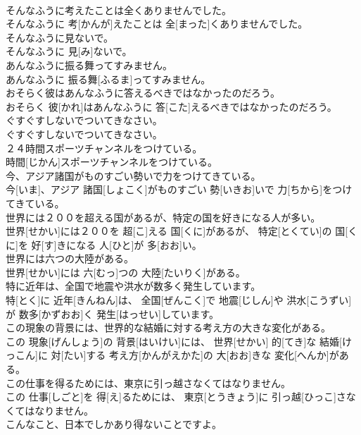 \documentclass[8pt]{extreport}
\begin{document}
\begin{CJK}{UTF8}{min}
\\	そんなふうに考えたことは全くありませんでした。	
\\	そんなふうに 考[かんが]えたことは 全[まった]くありませんでした。	
\\	そんなふうに見ないで。	
\\	そんなふうに 見[み]ないで。	
\\	あんなふうに振る舞ってすみません。	
\\	あんなふうに 振る舞[ふるま]ってすみません。	
\\	おそらく彼はあんなふうに答えるべきではなかったのだろう。	
\\	おそらく 彼[かれ]はあんなふうに 答[こた]えるべきではなかったのだろう。	
\\	ぐすぐすしないでついてきなさい。	
\\	ぐすぐすしないでついてきなさい。	
\\	２４時間スポーツチャンネルをつけている。	
\\	時間[じかん]スポーツチャンネルをつけている。	
\\	今、アジア諸国がものすごい勢いで力をつけてきている。	
\\	今[いま]、アジア 諸国[しょこく]がものすごい 勢[いきお]いで 力[ちから]をつけてきている。	
\\	世界には２００を超える国があるが、特定の国を好きになる人が多い。	
\\	世界[せかい]には２００を 超[こ]える 国[くに]があるが、 特定[とくてい]の 国[くに]を 好[す]きになる 人[ひと]が 多[おお]い。	
\\	世界には六つの大陸がある。	
\\	世界[せかい]には 六[むっ]つの 大陸[たいりく]がある。	
\\	特に近年は、全国で地震や洪水が数多く発生しています。	
\\	特[とく]に 近年[きんねん]は、 全国[ぜんこく]で 地震[じしん]や 洪水[こうずい]が 数多[かずおお]く 発生[はっせい]しています。	
\\	この現象の背景には、世界的な結婚に対する考え方の大きな変化がある。	
\\	この 現象[げんしょう]の 背景[はいけい]には、 世界[せかい] 的[てき]な 結婚[けっこん]に 対[たい]する 考え方[かんがえかた]の 大[おお]きな 変化[へんか]がある。	
\\	この仕事を得るためには、東京に引っ越さなくてはなりません。	
\\	この 仕事[しごと]を 得[え]るためには、 東京[とうきょう]に 引っ越[ひっこ]さなくてはなりません。	
\\	こんなこと、日本でしかあり得ないことですよ。	

\end{CJK}
\end{document}
